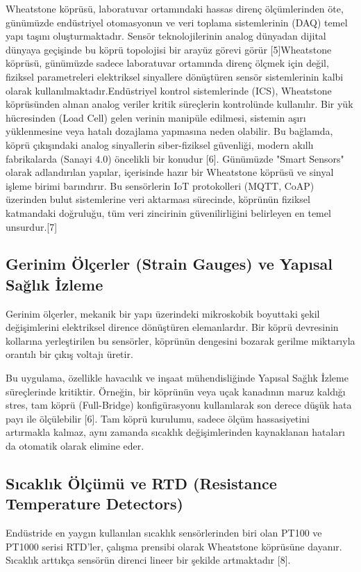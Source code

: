 \documentclass[12pt,a4paper]{article}
\begin{document}
Wheatstone köprüsü, laboratuvar ortamındaki hassas direnç ölçümlerinden öte, günümüzde endüstriyel otomasyonun ve veri toplama sistemlerinin (DAQ) temel yapı taşını oluşturmaktadır. Sensör teknolojilerinin analog dünyadan dijital dünyaya geçişinde bu köprü topolojisi bir arayüz görevi görür [5]Wheatstone köprüsü, günümüzde sadece laboratuvar ortamında direnç ölçmek için değil, fiziksel parametreleri elektriksel sinyallere dönüştüren sensör sistemlerinin kalbi olarak kullanılmaktadır.Endüstriyel kontrol sistemlerinde (ICS), Wheatstone köprüsünden alınan analog veriler kritik süreçlerin kontrolünde kullanılır. Bir yük hücresinden (Load Cell) gelen verinin manipüle edilmesi, sistemin aşırı yüklenmesine veya hatalı dozajlama yapmasına neden olabilir. Bu bağlamda, köprü çıkışındaki analog sinyallerin siber-fiziksel güvenliği, modern akıllı fabrikalarda (Sanayi 4.0) öncelikli bir konudur [6].
Günümüzde "Smart Sensors" olarak adlandırılan yapılar, içerisinde hazır bir Wheatstone köprüsü ve sinyal işleme birimi barındırır. Bu sensörlerin IoT protokolleri (MQTT, CoAP) üzerinden bulut sistemlerine veri aktarması sürecinde, köprünün fiziksel katmandaki doğruluğu, tüm veri zincirinin güvenilirliğini belirleyen en temel unsurdur.[7]

\subsection{Gerinim Ölçerler (Strain Gauges) ve Yapısal Sağlık İzleme}
Gerinim ölçerler, mekanik bir yapı üzerindeki mikroskobik boyuttaki şekil değişimlerini elektriksel dirence dönüştüren elemanlardır. Bir köprü devresinin kollarına yerleştirilen bu sensörler, köprünün dengesini bozarak gerilme miktarıyla orantılı bir çıkış voltajı üretir.



Bu uygulama, özellikle havacılık ve inşaat mühendisliğinde Yapısal Sağlık İzleme süreçlerinde kritiktir. Örneğin, bir köprünün veya uçak kanadının maruz kaldığı stres, tam köprü (Full-Bridge) konfigürasyonu kullanılarak son derece düşük hata payı ile ölçülebilir [6]. Tam köprü kurulumu, sadece ölçüm hassasiyetini artırmakla kalmaz, aynı zamanda sıcaklık değişimlerinden kaynaklanan hataları da otomatik olarak elimine eder.

\subsection{Sıcaklık Ölçümü ve RTD (Resistance Temperature Detectors)}
Endüstride en yaygın kullanılan sıcaklık sensörlerinden biri olan PT100 ve PT1000 serisi RTD'ler, çalışma prensibi olarak Wheatstone köprüsüne dayanır. Sıcaklık arttıkça sensörün direnci lineer bir şekilde artmaktadır [8]. 
\end{document}
